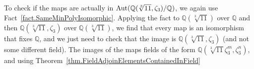 \begin{example}
\begin{flushleft}
\end{flushleft}
To check if the maps are actually in $\operatorname{Aut}(\mathbb{Q}(\sqrt[3]{11},\zeta_3)/\mathbb{Q})$, we again use Fact~\ref{fact.SameMinPolyIsomorphic}. Applying the fact to $\mathbb{Q}(\sqrt[3]{11})$ over $\mathbb{Q}$ and then $\mathbb{Q}(\sqrt[3]{11},\zeta_3)$ over $\mathbb{Q}(\sqrt[3]{11})$, we find that every map is an isomorphism that fixes $\mathbb{Q}$, and we just need to check that the image is $\mathbb{Q}(\sqrt[3]{11},\zeta_3)$ (and not some different field). The images of the maps fields of the form $\mathbb{Q}(\sqrt[3]{11}\zeta_3^m,\zeta_3^n)$, and using Theorem~\ref{thm.FieldAdjoinElementsContainedInField}  


\end{example}